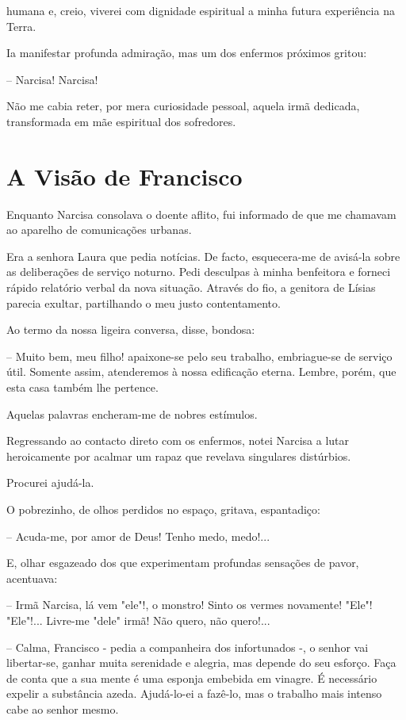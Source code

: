 \documentclass[portuguese,12pt,a4paper]{scrbook}
\begin{document}
	
	humana e, creio, viverei com dignidade espiritual a minha futura experiência na Terra.
	
	Ia manifestar profunda admiração, mas um dos enfermos próximos gritou:
	
	– Narcisa! Narcisa!
	
	Não me cabia reter, por mera curiosidade pessoal, aquela irmã dedicada, transformada em mãe espiritual dos sofredores.
	
	
	\chapter{A Visão de Francisco}
	
	Enquanto Narcisa consolava o doente aflito, fui informado de que me chamavam ao aparelho de comunicações urbanas.
	
	Era a senhora Laura que pedia notícias. De facto, esquecera-me de avisá-la sobre as deliberações de serviço noturno. Pedi desculpas à minha benfeitora e forneci rápido relatório verbal da nova situação. Através do fio, a genitora de Lísias parecia exultar, partilhando o meu justo contentamento.
	
	Ao termo da nossa ligeira conversa, disse, bondosa:
	
	– Muito bem, meu filho! apaixone-se pelo seu trabalho, embriague-se de serviço útil. Somente assim, atenderemos à nossa edificação eterna. Lembre, porém, que esta casa também lhe pertence.
	
	Aquelas palavras encheram-me de nobres estímulos.
	
	Regressando ao contacto direto com os enfermos, notei Narcisa a lutar heroicamente por acalmar um rapaz que revelava singulares distúrbios.
	
	Procurei ajudá-la.
	
	O pobrezinho, de olhos perdidos no espaço, gritava, espantadiço:
	
	– Acuda-me, por amor de Deus! Tenho medo, medo!...
	
	E, olhar esgazeado dos que experimentam profundas sensações de pavor, acentuava:
	
	– Irmã Narcisa, lá vem "ele"!, o monstro! Sinto os vermes novamente! "Ele"! "Ele"!... Livre-me "dele" irmã! Não quero, não quero!...
	
	
	– Calma, Francisco - pedia a companheira dos infortunados -, o senhor vai libertar-se, ganhar muita serenidade e alegria, mas depende do seu esforço. Faça de conta que a sua mente é uma esponja embebida em vinagre. É necessário expelir a substância azeda. Ajudá-lo-ei a fazê-lo, mas o trabalho mais intenso cabe ao senhor mesmo.
	
\end{document}
